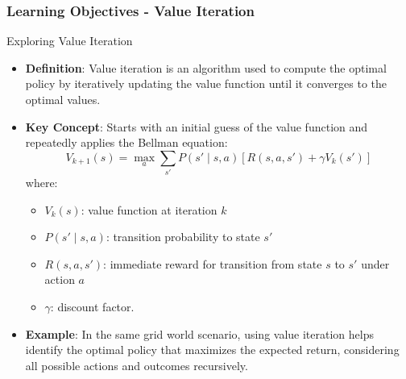 \documentclass[aspectratio=169]{beamer}
\begin{document}
\begin{frame}[fragile]
    \frametitle{Learning Objectives - Value Iteration}
    \begin{block}{Exploring Value Iteration}
        \begin{itemize}
            \item \textbf{Definition}: Value iteration is an algorithm used to compute the optimal policy by iteratively updating the value function until it converges to the optimal values.
            \item \textbf{Key Concept}: Starts with an initial guess of the value function and repeatedly applies the Bellman equation:
            \begin{equation}
                V_{k+1}(s) = \max_a \sum_{s'} P(s' \mid s, a) \left[ R(s, a, s') + \gamma V_k(s') \right]
            \end{equation}
            where:
            \begin{itemize}
                \item \( V_k(s) \): value function at iteration \( k \)
                \item \( P(s' \mid s, a) \): transition probability to state \( s' \)
                \item \( R(s, a, s') \): immediate reward for transition from state \( s \) to \( s' \) under action \( a \)
                \item \( \gamma \): discount factor.
            \end{itemize}
            \item \textbf{Example}: In the same grid world scenario, using value iteration helps identify the optimal policy that maximizes the expected return, considering all possible actions and outcomes recursively.
        \end{itemize}
    \end{block}
\end{frame}
\end{document}
